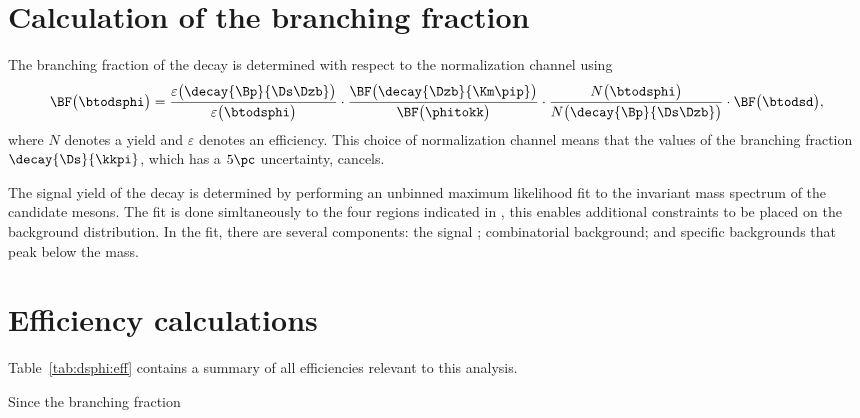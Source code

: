 \section{Calculation of the branching fraction}
\label{sec:dsphi:bf}
The branching fraction of the decay \btodsphi is determined with respect to the normalization
channel \btodsd using
\begin{equation}
  \BF\big(\btodsphi\big) =
  \frac{\varepsilon\big(\decay{\Bp}{\Ds\Dzb}\big)}{\varepsilon\big(\btodsphi\big)}
  \cdot
  \frac{\BF\big(\decay{\Dzb}{\Km\pip}\big)}{\BF\big(\phitokk\big)}
  \cdot
  \frac{N\big(\btodsphi\big)}{N\big(\decay{\Bp}{\Ds\Dzb}\big)}
  \cdot
  \BF\big(\btodsd\big)
  , \\
\end{equation}
where $N$ denotes a yield and $\varepsilon$ denotes an efficiency.
This choice of normalization channel means that the values of the branching fraction
$\decay{\Ds}{\kkpi}$, which has a $5\pc$ uncertainty, cancels.

The signal yield of the decay \btodsphi is determined by performing an unbinned maximum likelihood
fit to the invariant mass spectrum of the candidate \Bp mesons.
The fit is done simltaneously to the four regions indicated in , this enables
additional constraints to be placed on the background distribution.
In the fit, there are several components: the signal \btodsphi; combinatorial background; and
specific backgrounds that peak below the \Bp mass.


\section{Efficiency calculations}
Table~\ref{tab:dsphi:eff} contains a summary of all efficiencies relevant to this analysis.

Since the branching fraction

